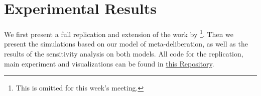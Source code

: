 \newpage
\chapter{Experimental Results}
\label{experiment_results}
We first present a full replication and extension of the work by
\citet{radDeliberationSinglePeakednessCoherent2021a}\footnote{This is omitted
for this week's meeting.}. Then we present the simulations based on our model of
meta-deliberation, as well as the results of the sensitivity analysis on both
models. All code for the replication, main experiment and visualizations can be
found in \href{https://github.com/amirsahrani/master_thesis}{this Repository}.
%
%
%
